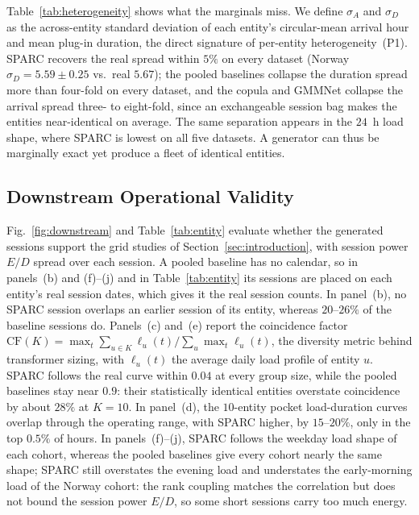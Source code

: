 \documentclass[journal]{IEEEtran}
\begin{document}
Table~\ref{tab:heterogeneity} shows what the marginals miss. We define $\sigma_A$ and $\sigma_D$ as the across-entity standard deviation of each entity's circular-mean arrival hour and mean plug-in duration, the direct signature of per-entity heterogeneity~(P1). SPARC recovers the real spread within $5\%$ on every dataset (Norway $\sigma_D=5.59\pm0.25$ vs.\ real $5.67$); the pooled baselines collapse the duration spread more than four-fold on every dataset, and the copula and GMMNet collapse the arrival spread three- to eight-fold, since an exchangeable session bag makes the entities near-identical on average. The same separation appears in the $24$~h load shape, where SPARC is lowest on all five datasets. A generator can thus be marginally exact yet produce a fleet of identical entities.



\subsection{Downstream Operational Validity}
\label{subsec:downstream}

Fig.~\ref{fig:downstream} and Table~\ref{tab:entity} evaluate whether the generated sessions support the grid studies of Section~\ref{sec:introduction}, with session power $E/D$ spread over each session. A pooled baseline has no calendar, so in panels~(b) and (f)--(j) and in Table~\ref{tab:entity} its sessions are placed on each entity's real session dates, which gives it the real session counts. In panel~(b), no SPARC session overlaps an earlier session of its entity, whereas $20$--$26\%$ of the baseline sessions do. Panels~(c) and~(e) report the coincidence factor $\mathrm{CF}(K) = \max_t \sum_{u \in K} \ell_u(t) / \sum_u \max_t \ell_u(t)$, the diversity metric behind transformer sizing, with $\ell_u(t)$ the average daily load profile of entity $u$. SPARC follows the real curve within $0.04$ at every group size, while the pooled baselines stay near $0.9$: their statistically identical entities overstate coincidence by about $28\%$ at $K = 10$. In panel~(d), the $10$-entity pocket load-duration curves overlap through the operating range, with SPARC higher, by $15$--$20\%$, only in the top $0.5\%$ of hours. In panels~(f)--(j), SPARC follows the weekday load shape of each cohort, whereas the pooled baselines give every cohort nearly the same shape; SPARC still overstates the evening load and understates the early-morning load of the Norway cohort: the rank coupling matches the correlation but does not bound the session power $E/D$, so some short sessions carry too much energy.
\end{document}
